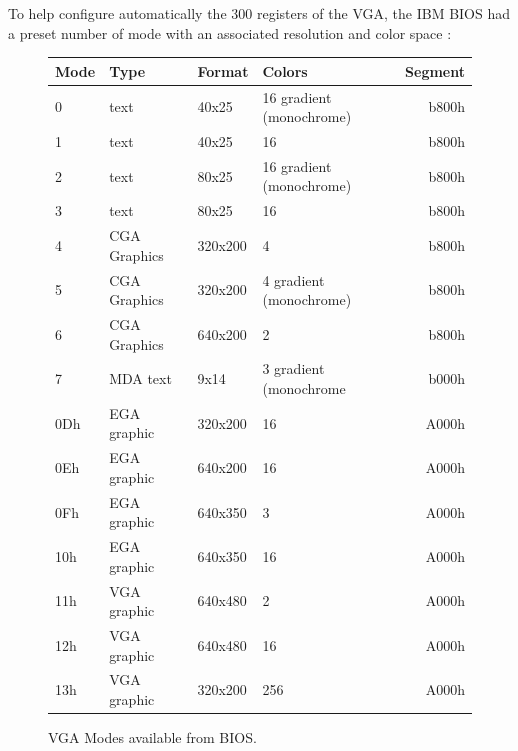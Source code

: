 \documentclass[book.tex]{subfiles}
\begin{document}
\bigskip
To help configure automatically the 300 registers of the VGA, the IBM BIOS had a preset number of mode with an associated resolution and color space :

\begin{figure}[H]
\centering
\begin{table}[H]
\begin{tabular}[c]{llllr}
\hline
\textbf{Mode} & \textbf{Type} & \textbf{Format} & \textbf{Colors}          & \multicolumn{1}{l}{\textbf{Segment}} \\ \hline
0             & text          & 40x25           & 16 gradient (monochrome) & b800h                                \\ \hline
1             & text          & 40x25           & 16                       & b800h                                \\ \hline
2             & text          & 80x25           & 16 gradient (monochrome) & b800h                                \\ \hline
3             & text          & 80x25           & 16                       & b800h                                \\ \hline
4             & CGA Graphics  & 320x200         & 4                        & b800h                                \\ \hline
5             & CGA Graphics  & 320x200         & 4 gradient (monochrome)  & b800h                                \\ \hline
6             & CGA Graphics  & 640x200         & 2                        & b800h                                \\ \hline
7             & MDA text      & 9x14            & 3 gradient (monochrome   & b000h                                \\ \hline
0Dh           & EGA graphic   & 320x200         & 16                       & A000h                                \\ \hline
0Eh           & EGA graphic   & 640x200         & 16                       & A000h                                \\ \hline
0Fh           & EGA graphic   & 640x350         & 3                        & A000h                                \\ \hline
10h           & EGA graphic   & 640x350         & 16                       & A000h                                \\ \hline
11h           & VGA graphic   & 640x480         & 2                        & A000h                                \\ \hline
12h           & VGA graphic   & 640x480         & 16                       & A000h                                \\ \hline
13h           & VGA graphic   & 320x200         & 256                      & A000h                                \\ \hline
\end{tabular}
\end{table}
\caption{VGA Modes available from BIOS.}\label{fig:vga_modes}
 \end{figure}
 
\end{document}
